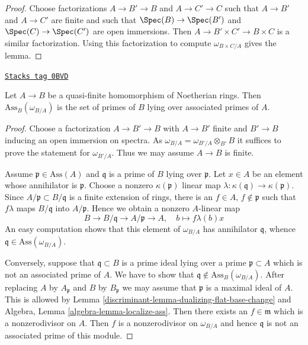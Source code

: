 \begin{proof}
Choose factorizations $A \to B' \to B$ and $A \to C' \to C$ such that
$A \to B'$ and $A \to C'$ are finite and such that $\Spec(B) \to \Spec(B')$
and $\Spec(C) \to \Spec(C')$ are open immersions. Then
$A \to B' \times C' \to B \times C$ is a similar factorization.
Using this factorization to compute $\omega_{B \times C/A}$
gives the lemma.
\end{proof}

\begin{lemma}
\label{discriminant-lemma-dualizing-associated-primes}
\href{https://stacks.math.columbia.edu/tag/0BVD}{\texttt{Stacks tag 0BVD}}

Let $A \to B$ be a quasi-finite homomorphism of Noetherian rings.
Then $\text{Ass}_B(\omega_{B/A})$ is the set of primes of $B$
lying over associated primes of $A$.
\end{lemma}

\begin{proof}

Choose a factorization $A \to B' \to B$ with $A \to B'$ finite and
$B' \to B$ inducing an open immersion on spectra. As
$\omega_{B/A} = \omega_{B'/A} \otimes_{B'} B$ it suffices
to prove the statement for $\omega_{B'/A}$. Thus we may assume $A \to B$
is finite.

\medskip\noindent
Assume $\mathfrak p \in \text{Ass}(A)$ and $\mathfrak q$ is a prime
of $B$ lying over $\mathfrak p$. Let $x \in A$ be an element whose
annihilator is $\mathfrak p$. Choose a nonzero $\kappa(\mathfrak p)$
linear map $\lambda : \kappa(\mathfrak q) \to \kappa(\mathfrak p)$.
Since $A/\mathfrak p \subset B/\mathfrak q$ is a finite extension
of rings, there is an $f \in A$, $f \not \in \mathfrak p$
such that $f\lambda$ maps $B/\mathfrak q$ into $A/\mathfrak p$.
Hence we obtain a nonzero $A$-linear map
$$
B \to B/\mathfrak q \to A/\mathfrak p \to A,\quad
b \mapsto f\lambda(b)x
$$
An easy computation shows that this element of $\omega_{B/A}$
has annihilator $\mathfrak q$, whence
$\mathfrak q \in \text{Ass}(\omega_{B/A})$.

\medskip\noindent
Conversely, suppose that $\mathfrak q \subset B$ is a prime ideal
lying over a prime $\mathfrak p \subset A$ which is not an associated
prime of $A$. We have to show that
$\mathfrak q \not \in \text{Ass}_B(\omega_{B/A})$.
After replacing $A$ by $A_\mathfrak p$ and $B$ by
$B_\mathfrak p$ we may assume that $\mathfrak p$ is a maximal ideal
of $A$. This is allowed by Lemma \ref{discriminant-lemma-dualizing-flat-base-change} and
Algebra, Lemma \ref{algebra-lemma-localize-ass}.
Then there exists an $f \in \mathfrak m$
which is a nonzerodivisor on $A$.
Then $f$ is a nonzerodivisor on $\omega_{B/A}$
and hence $\mathfrak q$ is not an associated prime of this module.
\end{proof}


